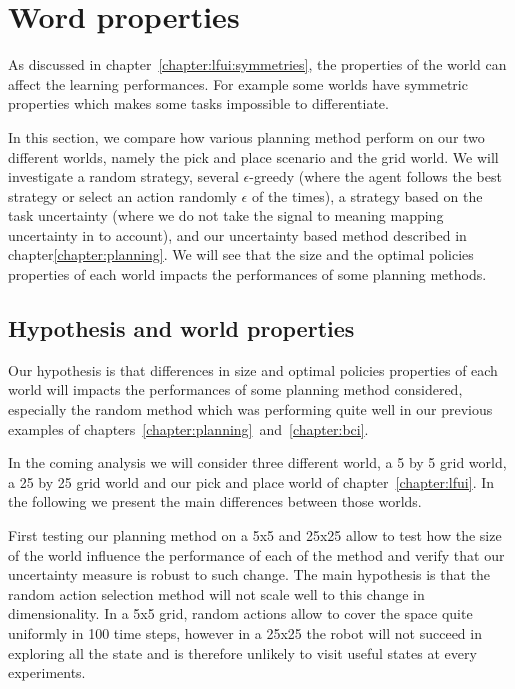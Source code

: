 
\section{Word properties}
\label{chapter:limitations:wordlproperties}



As discussed in chapter~\ref{chapter:lfui:symmetries}, the properties of the world can affect the learning performances. For example some worlds have symmetric properties which makes some tasks impossible to differentiate.

In this section, we compare how various planning method perform on our two different worlds, namely the pick and place scenario and the grid world. We will investigate a random strategy, several $\epsilon$-greedy (where the agent follows the best strategy or select an action randomly $\epsilon$ of the times), a strategy based on the task uncertainty (where we do not take the signal to meaning mapping uncertainty in to account), and our uncertainty based method described in chapter\ref{chapter:planning}. We will see that the size and the optimal policies properties of each world impacts the performances of some planning methods.

\subsection{Hypothesis and world properties}

Our hypothesis is that differences in size and optimal policies properties of each world will impacts the performances of some planning method considered, especially the random method which was performing quite well in our previous examples of chapters~\ref{chapter:planning}~and~\ref{chapter:bci}.

In the coming analysis we will consider three different world, a 5 by 5 grid world, a 25 by 25 grid world and our pick and place world of chapter~\ref{chapter:lfui}. In the following we present the main differences between those worlds.

First testing our planning method on a 5x5 and 25x25 allow to test how the size of the world influence the performance of each of the method and verify that our uncertainty measure is robust to such change. The main hypothesis is that the random action selection method will not scale well to this change in dimensionality. In a 5x5 grid, random actions allow to cover the space quite uniformly in 100 time steps, however in a 25x25 the robot will not succeed in exploring all the state and is therefore unlikely to visit useful states at every experiments.

